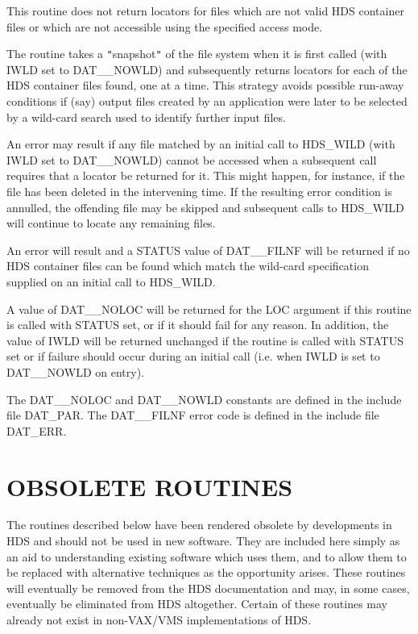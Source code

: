{{{         \sstitem
         This routine does not return locators for files which are not
         valid HDS container files or which are not accessible using the
         specified access mode.

         \sstitem
         The routine takes a {\tt "}snapshot{\tt "} of the file system when it is
         first called (with IWLD set to DAT\_\_NOWLD) and subsequently
         returns locators for each of the HDS container files found, one
         at a time. This strategy avoids possible run-away conditions if
         (say) output files created by an application were later to be
         selected by a wild-card search used to identify further input
         files.

         \sstitem
         An error may result if any file matched by an initial call to
         HDS\_WILD (with IWLD set to DAT\_\_NOWLD) cannot be accessed when a
         subsequent call requires that a locator be returned for it. This
         might happen, for instance, if the file has been deleted in the
         intervening time. If the resulting error condition is annulled,
         the offending file may be skipped and subsequent calls to
         HDS\_WILD will continue to locate any remaining files.

         \sstitem
         An error will result and a STATUS value of DAT\_\_FILNF will be
         returned if no HDS container files can be found which match the
         wild-card specification supplied on an initial call to HDS\_WILD.

         \sstitem
         A value of DAT\_\_NOLOC will be returned for the LOC argument if
         this routine is called with STATUS set, or if it should fail for
         any reason. In addition, the value of IWLD will be returned
         unchanged if the routine is called with STATUS set or if failure
         should occur during an initial call (i.e. when IWLD is set to
         DAT\_\_NOWLD on entry).

         \sstitem
         The DAT\_\_NOLOC and DAT\_\_NOWLD constants are defined in the
         include file DAT\_PAR. The DAT\_\_FILNF error code is defined in the
         include file DAT\_ERR.
      }
   }
}
\normalsize

\newpage
\section{OBSOLETE ROUTINES}
The routines described below have been rendered obsolete by developments in HDS
and should not be used in new software. They are included here simply as an aid
to understanding existing software which uses them, and to allow them to be
replaced with alternative techniques as the opportunity arises. These routines
will eventually be removed from the HDS documentation and may, in some cases,
eventually be eliminated from HDS altogether. Certain of these routines may
already not exist in non-VAX/VMS implementations of HDS.

